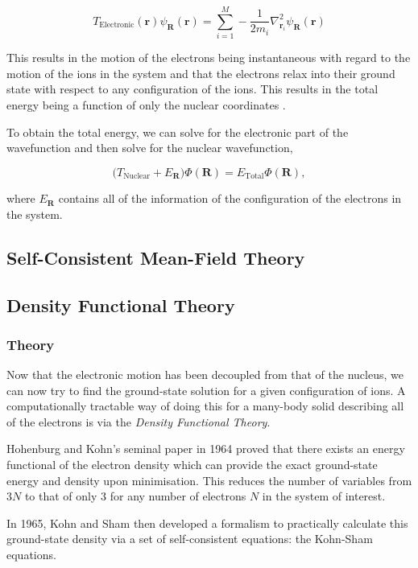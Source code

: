 \documentclass[11pt]{article}
\begin{document}
\[T_{\text{Electronic}}(\mathbf{r}) \psi_{\mathbf{R}}(\mathbf{r}) = \sum_{i =
1}^{M} - \frac{1}{2m_{i}} \nabla^{2}_{\mathbf{r}_{i}}
\psi_{\mathbf{R}}(\mathbf{r}) \]

This results in the motion of the electrons being instantaneous with regard to the
motion of the ions in the system and that the electrons relax into their ground state with
respect to any configuration of the ions. This results in the total energy being a function of
only the nuclear coordinates \cite{Finnis1997}. 

To obtain the total energy, we can solve for the electronic part of the wavefunction and then
solve for the nuclear wavefunction,

\[ \Big( T_{\text{Nuclear}} + E_{\mathbf{R}} \Big) \Phi(\mathbf{R}) = E_{\text{Total}} \Phi(\mathbf{R}),\]

where \(E_{\mathbf{R}}\) contains all of the information of the configuration of the electrons in
the system. 

\subsection{Self-Consistent Mean-Field Theory}
\label{sec:orga817c17}

\subsection{Density Functional Theory}
\label{sec:orgad6ec01}

\subsubsection{Theory}
\label{sec:org3cb8a06}

Now that the electronic motion has been decoupled from that of the nucleus, we can now try to
find the ground-state solution for a given configuration of ions. A computationally tractable
way of doing this for a many-body solid describing all of the electrons is via the \emph{Density
Functional Theory}. 

Hohenburg and Kohn's seminal paper in 1964 proved that there exists an energy functional of the
electron density which can provide the exact ground-state energy and density upon
minimisation. This reduces the number of variables from \(3N\) to that of only 3 for any number
of electrons \(N\) in the system of interest.

In 1965, Kohn and Sham then developed a formalism to practically calculate this ground-state density via
a set of self-consistent equations: the Kohn-Sham equations. 
\end{document}

